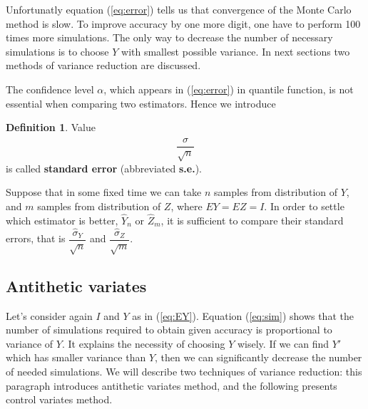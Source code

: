 \documentclass[a4paper,12pt, oneside]{book}
\theoremstyle{definition}
\newtheorem{mydef}{Definition}[section]
\theoremstyle{remark}
\begin{document}
Unfortunatly equation (\ref{eq:error}) tells us that convergence of the Monte Carlo method is slow. To improve accuracy by one more digit, one have to perform 100 times more simulations. The only way to decrease the number of necessary simulations is to choose $Y$ with smallest possible variance. In next sections two methods of variance reduction are discussed.

The confidence level $\alpha$, which appears in (\ref{eq:error}) in quantile function, is not essential when comparing two estimators. Hence we introduce 
\begin{mydef}
 Value
 \begin{equation}
  \label{eq:stderr}
  \frac{\hat{\sigma}}{\sqrt{n}}
 \end{equation}
is called \textbf{standard error} (abbreviated \textbf{s.e.}).
\end{mydef}
Suppose that in some fixed time we can take $n$ samples from distribution of $Y$, and $m$ samples from distribution of $Z$, where $EY = EZ = I$. In order to settle which estimator is better, $\hat{Y}_n$ or $\hat{Z}_m$, it is sufficient to compare their standard errors, that is $\dfrac{\hat{\sigma}_Y}{\sqrt{n}}$ and $\dfrac{\hat{\sigma}_Z}{\sqrt{m}}$.

\subsection{Antithetic variates}
Let's consider again $I$ and $Y$ as in (\ref{eq:EY}). Equation (\ref{eq:sim}) shows that the number of simulations required to obtain given accuracy is proportional to variance of $Y$. It explains the necessity of choosing $Y$ wisely. If we can find $Y'$ which has smaller variance than $Y$, then we can significantly decrease the number of needed simulations. We will describe two techniques of variance reduction: this paragraph introduces antithetic variates method, and the following presents control variates method.
\end{document}
